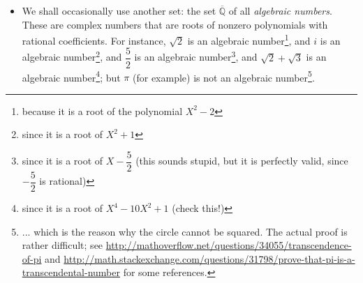 \documentclass[numbers=enddot,12pt,final,onecolumn,notitlepage]{scrartcl}%
\theoremstyle{definition}
\begin{document}
\begin{itemize}
Complex numbers can be formally defined as pairs of real numbers $\left(
a,b\right)  $ with an entrywise addition (that is, $\left(  a,b\right)
+\left(  a^{\prime},b^{\prime}\right)  =\left(  a+a^{\prime},b+b^{\prime
}\right)  $, exactly like $1\times2$-matrices) and a somewhat strange-looking
multiplication (namely, $\left(  a,b\right)  \left(  a^{\prime},b^{\prime
}\right)  =\left(  aa^{\prime}-bb^{\prime},ab^{\prime}+ba^{\prime}\right)
$).\ \ \ \ \footnote{This sort of definition is not unlike our definition of
matrices: they are also tables with entrywise addition and a less simple
multiplication.} But the way everyone thinks about complex numbers
(informally) is that they are an extension of real numbers (so $\mathbb{R}$ is
a subset of $\mathbb{C}$) by adding a new \textquotedblleft imaginary
number\textquotedblright\ $i$ which satisfies $i^{2}=-1$. They are supposed to
behave like real numbers as far as laws of addition and multiplication are
concerned (thus, for instance, $a\left(  b+c\right)  =ab+ac$ and $a\left(
bc\right)  =\left(  ab\right)  c$); using these laws and the requirement that
$i^{2}=-1$, one can easily see how to multiply and add arbitrary complex
numbers. These two definitions (the formal one as pairs of real numbers, and
the informal one as \textquotedblleft extended real numbers\textquotedblright)
are equivalent, and the complex number $\left(  a,b\right)  $ (according to
the first definition) corresponds to the complex number $a+bi$ (according to
the second definition).

For a detailed introduction to complex numbers, see \cite[\S 2]{LaNaSc16}.

\item We shall occasionally use another set: the set $\overline{\mathbb{Q}}$
of all \textit{algebraic numbers}. These are complex numbers that are roots of
nonzero polynomials with rational coefficients. For instance, $\sqrt{2}$ is an
algebraic number\footnote{because it is a root of the polynomial $X^{2}-2$},
and $i$ is an algebraic number\footnote{since it is a root of $X^{2}+1$}, and
$\dfrac{5}{2}$ is an algebraic number\footnote{since it is a root of
$X-\dfrac{5}{2}$ (this sounds stupid, but it is perfectly valid, since
$-\dfrac{5}{2}$ is rational)}, and $\sqrt{2}+\sqrt{3}$ is an algebraic
number\footnote{since it is a root of $X^{4}-10X^{2}+1$ (check this!)}; but
$\pi$ (for example) is not an algebraic number\footnote{... which is the
reason why the circle cannot be squared. The actual proof is rather difficult;
see \url{http://mathoverflow.net/questions/34055/transcendence-of-pi} and
\url{http://math.stackexchange.com/questions/31798/prove-that-pi-is-a-transcendental-number}
for some references.}.


\end{itemize}
\end{document}
